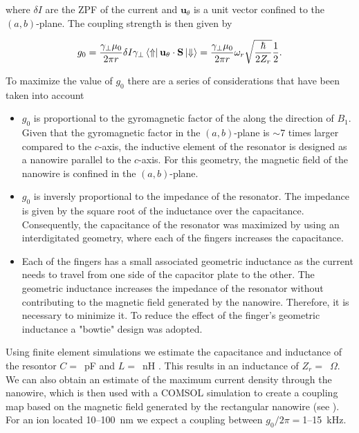 \noindent where $\delta I$ are the ZPF of the current and $\mathbf{u}_\theta$ is a unit vector confined to the $(a, b)$-plane. The coupling strength is then given by

\begin{align}
\begin{split}
    g_0 = \frac{\gamma_\perp \mu_0}{2 \pi r} \delta I \gamma_\perp \bra{\Uparrow}  \mathbf{u}_\theta \cdot \mathbf{S} \ket{\Downarrow} = \frac{\gamma_\perp \mu_0}{2 \pi r} \omega_r \sqrt{\frac{\hbar}{2Z_r}} \frac{1}{2}.
\end{split}
\end{align}

To maximize the value of $g_0$ there are a series of considerations that have been taken into account

\begin{itemize}
    \item $g_0$ is proportional to the gyromagnetic factor of the \Er along the direction of $B_1$. Given that the gyromagnetic factor in the $(a, b)$-plane is $\sim$7 times larger compared to the $c$-axis, the inductive element of the resonator is designed as a nanowire parallel to the $c$-axis. For this geometry, the magnetic field of the nanowire is confined in the $(a, b)$-plane. 
    \item $g_0$ is inversly proportional to the impedance of the resonator. The impedance is given by the square root of the inductance over the capacitance. Consequently, the capacitance of the resonator was maximized by using an interdigitated geometry, where each of the fingers increases the capacitance.
    \item Each of the fingers has a small associated geometric inductance as the current needs to travel from one side of the capacitor plate to the other. The geometric inductance increases the impedance of the resonator without contributing to the magnetic field generated by the nanowire. Therefore, it is necessary to minimize it. To reduce the effect of the finger's geometric inductance a "bowtie" design was adopted.
\end{itemize} 

Using finite element simulations we estimate the capacitance and inductance of the resontor $C=$~pF and $L=$~nH . This results in an inductance of $Z_r=$~$\Omega$. We can also obtain an estimate of the maximum current density through the nanowire, which is then used with a COMSOL simulation to create a coupling map based on the magnetic field generated by the rectangular nanowire (see ). For an \Er ion located 10--100~nm we expect a coupling between $g_0/2\pi=$1--15~kHz.

